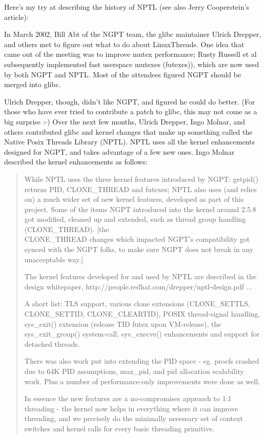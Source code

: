\documentclass[twoside, xetex]{report}
\begin{document}
Here's my try at describing the history of NPTL (see also Jerry Cooperstein's article):

In March 2002, Bill Abt of the NGPT team, the glibc maintainer Ulrich Drepper, and others met to figure out what to do about LinuxThreads. One idea that came out of the meeting was to improve mutex performance; Rusty Russell et al subsequently implemented fast userspace mutexes (futexes)), which are now used by both NGPT and NPTL. Most of the attendees figured NGPT should be merged into glibc.

Ulrich Drepper, though, didn't like NGPT, and figured he could do better. (For those who have ever tried to contribute a patch to glibc, this may not come as a big surprise :-) Over the next few months, Ulrich Drepper, Ingo Molnar, and others contributed glibc and kernel changes that make up something called the Native Posix Threads Library (NPTL). NPTL uses all the kernel enhancements designed for NGPT, and takes advantage of a few new ones. Ingo Molnar described the kernel enhancements as follows:

\begin{quotation}
While NPTL uses the three kernel features introduced by NGPT: getpid() returns PID, CLONE\_THREAD and futexes; NPTL also uses (and relies on) a much wider set of new kernel features, developed as part of this project.
Some of the items NGPT introduced into the kernel around 2.5.8 got modified, cleaned up and extended, such as thread group handling (CLONE\_THREAD). [the\\ CLONE\_THREAD changes which impacted NGPT's compatibility got synced with the NGPT folks, to make sure NGPT does not break in any unacceptable way.]

The kernel features developed for and used by NPTL are described in the design whitepaper, http://people.redhat.com/drepper/nptl-design.pdf ...

A short list: TLS support, various clone extensions (CLONE\_SETTLS, \\CLONE\_SETTID, CLONE\_CLEARTID), POSIX thread-signal handling, sys\_exit() extension (release TID futex upon VM-release), the sys\_exit\_group() system-call, sys\_execve() enhancements and support for detached threads.

There was also work put into extending the PID space - eg. procfs crashed due to 64K PID assumptions, max\_pid, and pid allocation scalability work. Plus a number of performance-only improvements were done as well.

In essence the new features are a no-compromises approach to 1:1 threading - the kernel now helps in everything where it can improve threading, and we precisely do the minimally necessary set of context switches and kernel calls for every basic threading primitive.
\end{quotation}
\end{document}
